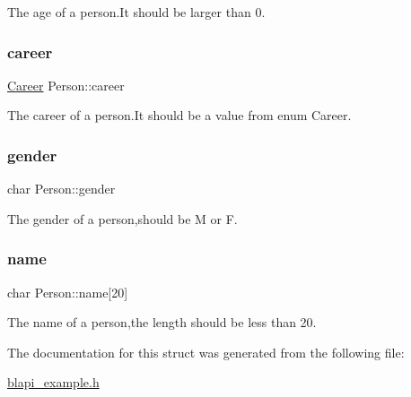 The age of a person.\+It should be larger than 0. \mbox{\label{structPerson_a6d70e8d878191108816fe330114af6a6}} 
\subsubsection{\texorpdfstring{career}{career}}
{\footnotesize\ttfamily \hyperlink{blapi__example_8h_a62cd6422824fadbc39768970839e09a5}{Career} Person\+::career}

The career of a person.\+It should be a value from enum Career. \mbox{\label{structPerson_aadbaa9e7532dcc90a2734868347b59d3}} 
\subsubsection{\texorpdfstring{gender}{gender}}
{\footnotesize\ttfamily char Person\+::gender}

The gender of a person,should be \textquotesingle{}M\textquotesingle{} or \textquotesingle{}F\textquotesingle{}. \mbox{\label{structPerson_ad6b4ae900027c222f1ed47650f0d76a2}} 
\subsubsection{\texorpdfstring{name}{name}}
{\footnotesize\ttfamily char Person\+::name\mbox{[}20\mbox{]}}

The name of a person,the length should be less than 20. 

The documentation for this struct was generated from the following file\+:\begin{DoxyCompactItemize}
\item 
\hyperlink{blapi__example_8h}{blapi\+\_\+example.\+h}\end{DoxyCompactItemize}
